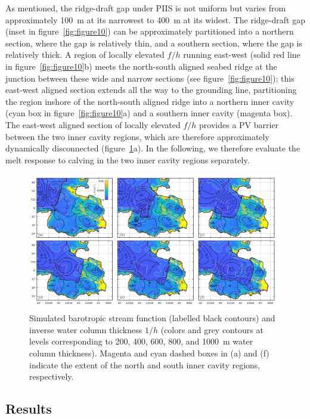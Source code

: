 \documentclass[draft]{agujournal2019}
\begin{document}
As mentioned, the ridge-draft gap under PIIS is not uniform but varies from approximately 100~m at its narrowest to 400~m at its widest.  The ridge-draft gap (inset in figure~\ref{fig:figure10}) can be approximately partitioned into a northern section, where the gap is relatively thin, and a southern section, where the gap is relatively thick. A region of locally elevated $f/h$ running east-west (solid red line in figure~\ref{fig:figure10}b) meets the north-south aligned seabed ridge at the junction between these wide and narrow sections (see figure~\ref{fig:figure10}); this east-west aligned section extends all the way to the grounding line, partitioning the region inshore of the north-south aligned ridge into a northern inner cavity (cyan box in figure~\ref{fig:figure10}a) and a southern inner cavity (magenta box). The east-west aligned section of locally elevated $f/h$  provides a PV barrier between the two inner cavity regions, which are therefore approximately dynamically disconnected (figure~\ref{fig:figure11}a). In the following, we therefore evaluate the melt response to calving in the two inner cavity regions separately.

\begin{figure}
    \centering
    \includegraphics[width = \textwidth]{../make_figures/plots/figure11.pdf}
    \caption{Simulated barotropic stream function (labelled black contours) and inverse water column thickness $1/h$ (colors and grey contours at levels corresponding to 200, 400, 600, 800, and 1000~m water column thickness). Magenta and cyan dashed boxes in (a) and (f) indicate the extent of the north and south inner cavity regions, respectively.}
    \label{fig:figure11}
\end{figure}


\subsection{Results}
\end{document}
